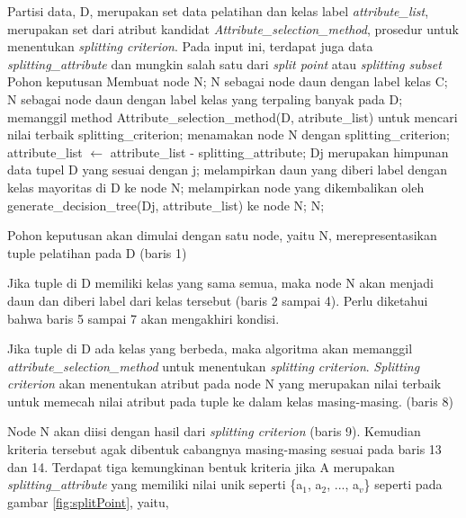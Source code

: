 \begin{algorithmic}[1]
	\REQUIRE Partisi data, D, merupakan set data pelatihan dan kelas label
	\REQUIRE \textsl{attribute\_list}, merupakan set dari atribut kandidat
	\REQUIRE \textsl{Attribute\_selection\_method}, prosedur untuk menentukan \textsl{splitting criterion}. Pada input ini, terdapat juga data \textsl{splitting\_attribute} dan mungkin salah satu dari \textsl{split point} atau \textsl{splitting subset}
	\ENSURE Pohon keputusan
	\STATE Membuat node N;
	  \RETURN N sebagai node daun dengan label kelas C;
	\ENDIF
		\RETURN N sebagai node daun dengan label kelas yang terpaling banyak pada D; 
	\ENDIF
	\STATE memanggil method Attribute\_selection\_method(D, atribute\_list) untuk mencari nilai terbaik splitting\_criterion;
	\STATE menamakan node N dengan splitting\_criterion;
		\STATE attribute\_list $\leftarrow$ attribute\_list - splitting\_attribute; 
	\ENDIF
		\STATE D\lowercase{j} merupakan himpunan data tupel D yang sesuai dengan j;
			\STATE melampirkan daun yang diberi label dengan kelas mayoritas di D ke node N;
		\ELSE
			\STATE melampirkan node yang dikembalikan oleh generate\_decision\_tree(D\lowercase{j}, attribute\_list) ke node N;
		\ENDIF
	\ENDFOR
\RETURN N;
\end{algorithmic}

Pohon keputusan akan dimulai dengan satu node, yaitu N, merepresentasikan tuple pelatihan pada D (baris 1)

Jika tuple di D memiliki kelas yang sama semua, maka node N akan menjadi daun dan diberi label dari kelas tersebut (baris 2 sampai 4). Perlu diketahui bahwa baris 5 sampai 7 akan mengakhiri kondisi.

Jika tuple di D ada kelas yang berbeda, maka algoritma akan memanggil \textsl{attribute\_selection\_method} untuk menentukan \textsl{splitting criterion}. \textsl{Splitting criterion} akan menentukan atribut pada node N yang merupakan nilai terbaik untuk memecah nilai atribut pada tuple ke dalam kelas masing-masing. (baris 8)

Node N akan diisi dengan hasil dari \textsl{splitting criterion} (baris 9). Kemudian kriteria tersebut agak dibentuk cabangnya masing-masing sesuai pada baris 13 dan 14. Terdapat tiga kemungkinan bentuk kriteria jika A merupakan \textsl{splitting\_attribute} yang memiliki nilai unik seperti \{a$_{1}$, a$_{2}$, ..., a$_{v}$\} seperti pada gambar \ref{fig:splitPoint}, yaitu,

